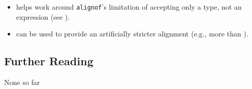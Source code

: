 \begin{itemize}
\item{helps work around \lstinline!alignof!'s limitation of accepting only a type, not an expression (see ).}
\item{can be used to provide an artificially stricter alignment (e.g., more than ).}

\end{itemize}

\subsection[Further Reading]{Further Reading}\label{further-reading}

None so far



